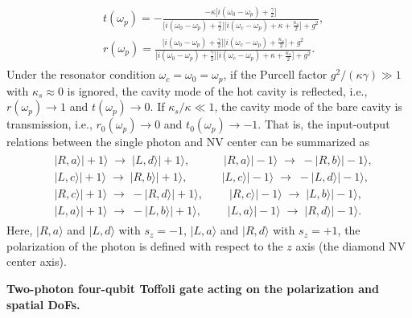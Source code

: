 \documentclass[showpacs,preprintnumbers,showkeys,amsmath,amssymb]{revtex4}%
\begin{document}
%
\begin{eqnarray}       \label{eq2}
\begin{split}
&t(\omega_p) = - \frac{-\kappa\big[i(\omega_0-\omega_p)+\frac{\gamma}{2}\big]}{\big[i(\omega_0-\omega_p)+\frac{\gamma}{2}\big]\big[i(\omega_c-\omega_p)+\kappa+\frac{\kappa_s}{2}\big]+g^2},\\
%
&r(\omega_p) =\frac{\big[i(\omega_0-\omega_p)+\frac{\gamma}{2}\big]\big[i(\omega_c-\omega_p)+\frac{\kappa_s}{2}\big]+g^2}{\big[i(\omega_0-\omega_p)+\frac{\gamma}{2}\big]\big[i(\omega_c-\omega_p)+\kappa+\frac{\kappa_s}{2}\big]+g^2}.
\end{split}
\end{eqnarray}
%
Under the resonator condition $\omega_c=\omega_0=\omega_p$, if the Purcell factor $g^2/(\kappa\gamma)\gg1$ with $\kappa_s\approx0$ is ignored, the cavity mode of the hot cavity is reflected, i.e., $r(\omega_p)\rightarrow1$ and $t(\omega_p)\rightarrow0$. If $\kappa_s/\kappa\ll1$, the cavity mode of the bare cavity is transmission, i.e., $r_0(\omega_p)\rightarrow0$ and $t_0(\omega_p)\rightarrow-1$. That is, the input-output relations between the single photon and NV center can be summarized as
\begin{eqnarray}       \label{eq3}
\begin{split}
&|R,a\rangle|+1\rangle\;\rightarrow\;|L,d\rangle|+1\rangle,\quad\qquad|R,a\rangle|-1\rangle\;\rightarrow\;-|R,b\rangle|-1\rangle,\\
%
&|L,c\rangle|+1\rangle\;\rightarrow\;|R,b\rangle|+1\rangle,\quad\qquad|L,c\rangle|-1\rangle\;\rightarrow\;-|L,d\rangle|-1\rangle,\\
%
&|R,c\rangle|+1\rangle\;\rightarrow\;-|R,d\rangle|+1\rangle,\;\qquad|R,c\rangle|-1\rangle\;\rightarrow\;|L,b\rangle|-1\rangle,\\
%
&|L,a\rangle|+1\rangle\;\rightarrow\;-|L,b\rangle|+1\rangle,\;\qquad|L,a\rangle|-1\rangle\;\rightarrow\;|R,d\rangle|-1\rangle.
%
\end{split}
\end{eqnarray}
%
Here, $|R,a\rangle$ and $|L,d\rangle$ with $s_z=-1$, $|L,a\rangle$ and $|R,d\rangle$ with $s_z=+1$, the polarization of the photon is defined with respect to the $z$ axis (the diamond NV center axis).





{\bf Two-photon four-qubit Toffoli gate acting on the polarization and spatial DoFs.}
%
%
\end{document}
